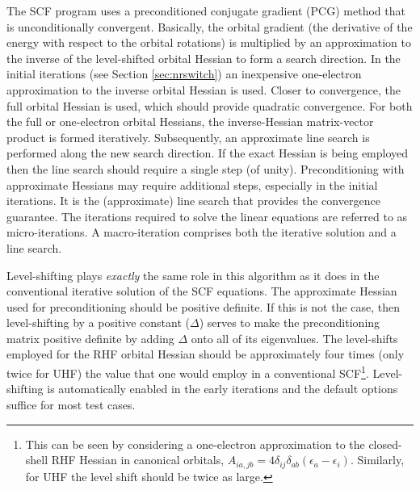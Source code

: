 
The SCF program uses a preconditioned conjugate gradient (PCG) method
that is unconditionally convergent.  Basically, the orbital gradient
(the derivative of the energy with respect to the orbital rotations)
is multiplied by an approximation to the inverse of the level-shifted
orbital Hessian to form a search direction.  In the initial iterations
(see Section \ref{sec:nrswitch}) an inexpensive one-electron
approximation to the inverse orbital Hessian is used.  Closer to
convergence, the full orbital Hessian is used, which should provide
quadratic convergence.  For both the full or one-electron orbital
Hessians, the inverse-Hessian matrix-vector product is formed
iteratively.  Subsequently, an approximate line search is performed
along the new search direction.  If the exact Hessian is being
employed then the line search should require a single step (of unity).
Preconditioning with approximate Hessians may require additional
steps, especially in the initial iterations.  It is the (approximate)
line search that provides the convergence guarantee.  The iterations
required to solve the linear equations are referred to as
micro-iterations.  A macro-iteration comprises both the iterative
solution and a line search.

Level-shifting plays {\em exactly} the same role in this algorithm as
it does in the conventional iterative solution of the SCF equations.
The approximate Hessian used for preconditioning should be positive
definite.  If this is not the case, then level-shifting by a positive
constant ($\Delta$) serves to make the preconditioning matrix positive
definite by adding $\Delta$ onto all of its eigenvalues.  The
level-shifts employed for the RHF orbital Hessian should be
approximately four times (only twice for UHF) the value that one would
employ in a conventional SCF\footnote{This can be seen by considering
  a one-electron approximation to the closed-shell RHF Hessian in
  canonical orbitals, $A_{ia,jb} = 4 \delta_{ij} \delta_{ab}
  (\epsilon_a - \epsilon_i)$.  Similarly, for UHF the level shift
  should be twice as large.}.  Level-shifting is automatically enabled
in the early iterations and the default options suffice for most test
cases.

